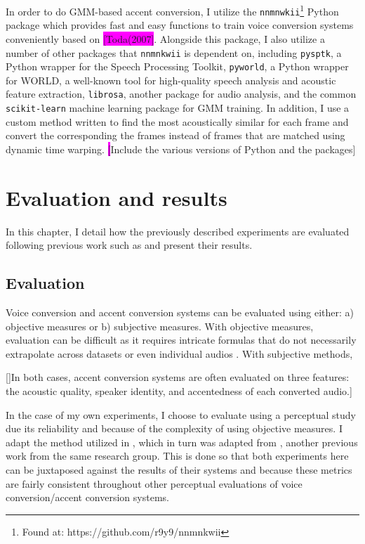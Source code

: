 \documentclass
[
    a4paper,
    twoside,
    12pt,
]
{report}
\begin{document}
In order to do GMM-based accent conversion, I utilize the
\texttt{nnmnwkii}\footnote{Found at: https://github.com/r9y9/nnmnkwii}
Python package which provides fast and easy functions to train voice
conversion systems conveniently based on
\colorbox{magenta}{[Toda(2007]}. Alongside this package, I also utilize
a number of other packages that \texttt{nnmnkwii} is dependent on,
including \texttt{pysptk}, a Python wrapper for the Speech Processing
Toolkit, \texttt{pyworld}, a Python wrapper for WORLD, a well-known tool
for high-quality speech analysis and acoustic feature extraction,
\texttt{librosa}, another package for audio analysis, and the common
\texttt{scikit-learn} machine learning package for GMM training. In
addition, I use a custom method written to find the most acoustically
similar for each frame and convert the corresponding the frames instead
of frames that are matched using dynamic time warping.
\colorbox{magenta}[Include the various versions of Python and the
packages{]}
\cleardoublepage
\chapter{Evaluation and results}

In this chapter, I detail how the previously described experiments are
evaluated following previous work such as \textcite{zhao2018a} and
present their results.

\hypertarget{evaluation}{%
\section{Evaluation}\label{evaluation}}

Voice conversion and accent conversion systems can be evaluated using
either: a) objective measures or b) subjective measures. With objective
measures, evaluation can be difficult as it requires intricate formulas
that do not necessarily extrapolate across datasets or even individual
audios \parencite{felps2010}. With subjective methods,

{[}{]}In both cases, accent conversion systems are often evaluated on
three features: the acoustic quality, speaker identity, and accentedness
of each converted audio.{]}

In the case of my own experiments, I choose to evaluate using a
perceptual study due its reliability and because of the complexity of
using objective measures. I adapt the method utilized in
\textcite{zhao2018a}, which in turn was adapted from
\textcite{aryal2014}, another previous work from the same research
group. This is done so that both experiments here can be juxtaposed
against the results of their systems and because these metrics are
fairly consistent throughout other perceptual evaluations of voice
conversion/accent conversion systems.
\end{document}
